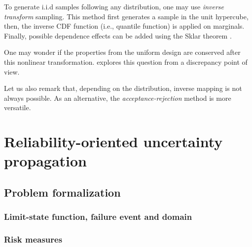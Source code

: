 To generate i.i.d samples following any distribution, one may use \textit{inverse transform} sampling.
This method first generates a sample in the unit hypercube, then, the inverse CDF function (i.e., quantile function) is applied on marginals. 
Finally, possible dependence effects can be added using the Sklar theorem .

One may wonder if the properties from the uniform design are conserved after this nonlinear transformation. 
\citet{hickernell_2020} explores this question from a discrepancy point of view. 

Let us also remark that, depending on the distribution, inverse mapping is not always possible.
As an alternative, the \textit{acceptance-rejection} method is more versatile. 





\newpage
\section{Reliability-oriented uncertainty propagation}

\subsection{Problem formalization}

\subsubsection{Limit-state function, failure event and domain}

\subsubsection{Risk measures }


